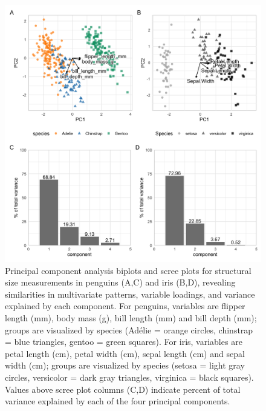\begin{Schunk}
\begin{figure}[htbp]

{\centering \includegraphics[width=6in]{fig/pca_plots} 

}

\caption[Principal component analysis biplots and scree plots for structural size measurements in penguins (A,C) and iris (B,D), revealing similarities in multivariate patterns, variable loadings, and variance explained by each component]{Principal component analysis biplots and scree plots for structural size measurements in penguins (A,C) and iris (B,D), revealing similarities in multivariate patterns, variable loadings, and variance explained by each component. For penguins, variables are flipper length (mm), body mass (g), bill length (mm) and bill depth (mm); groups are visualized by species (Adélie = orange circles, chinstrap = blue triangles, gentoo = green squares). For iris, variables are petal length (cm), petal width (cm), sepal length (cm) and sepal width (cm); groups are visualized by species (setosa = light gray circles, versicolor = dark gray triangles, virginica = black squares). Values above scree plot columns (C,D) indicate percent of total variance explained by each of the four principal components.}\label{fig:pca}
\end{figure}
\end{Schunk}

